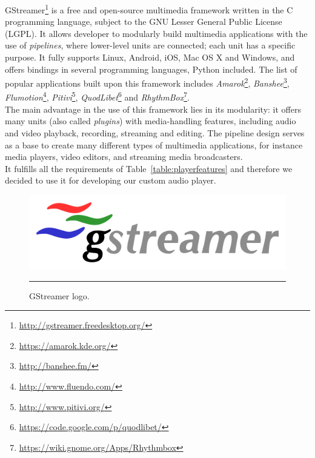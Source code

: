 GStreamer\footnote{\url{http://gstreamer.freedesktop.org/}} is a free and open-source multimedia framework written in the C programming language, subject to the GNU Lesser General Public License (LGPL). It allows developer to modularly build multimedia applications with the use of \textit{pipelines}, where lower-level units are connected; each unit has a specific purpose. It fully supports Linux, Android, iOS, Mac OS X and Windows, and offers bindings in several programming languages, Python included. The list of popular applications built upon this framework includes \textit{Amarok}\footnote{\url{https://amarok.kde.org/}}, \textit{Banshee}\footnote{\url{http://banshee.fm/}}, \textit{Flumotion}\footnote{\url{http://www.fluendo.com/}}, \textit{Pitivi}\footnote{\url{http://www.pitivi.org/}}, \textit{QuodLibet}\footnote{\url{https://code.google.com/p/quodlibet/}} and \textit{RhythmBox}\footnote{\url{https://wiki.gnome.org/Apps/Rhythmbox}}. \\
The main advantage in the use of this framework lies in its modularity: it offers many units (also called \textit{plugins}) with media-handling features, including audio and video playback, recording, streaming and editing. The pipeline design serves as a base to create many different types of multimedia applications, for instance media players, video editors, and streaming media broadcasters. \\ It fulfills all the requirements of Table~\ref{table:playerfeatures} and therefore we decided to use it for developing our custom audio player.

\begin{figure}[h]
\begin{center}
\includegraphics[scale=0.5]{Figures/gstreamer.png}
    \rule{20em}{0.5pt}
  \caption[GStreamer]{GStreamer logo.}
  \label{fig:GStreamer}
\end{center}
\end{figure}

